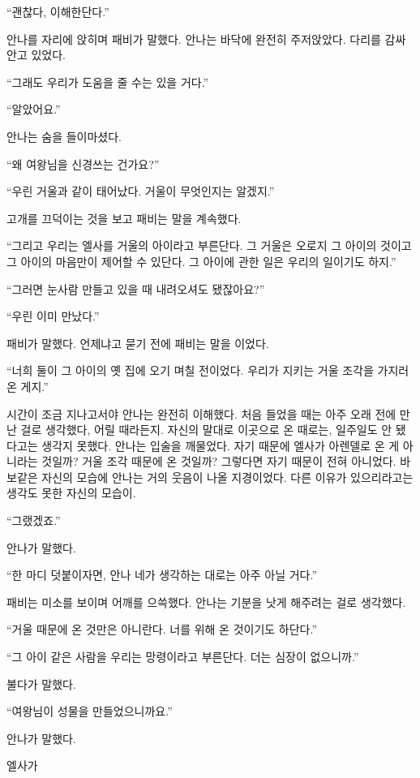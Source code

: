 ``괜찮다, 이해한단다.''

안나를 자리에 앉히며 패비가 말했다. 안나는 바닥에 완전히 주저앉았다. 다리를 감싸 안고 있었다.

``그래도 우리가 도움을 줄 수는 있을 거다.''

``알았어요.''

안나는 숨을 들이마셨다.

``왜 여왕님을 신경쓰는 건가요?''

``우린 거울과 같이 태어났다. 거울이 무엇인지는 알겠지.''

고개를 끄덕이는 것을 보고 패비는 말을 계속했다.

``그리고 우리는 엘사를 거울의 아이라고 부른단다. 그 거울은 오로지 그 아이의 것이고 그 아이의 마음만이 제어할 수 있단다. 그 아이에 관한 일은 우리의 일이기도 하지.''

``그러면 눈사람 만들고 있을 때 내려오셔도 됐잖아요?''

``우린 이미 만났다.''

패비가 말했다. 언제냐고 묻기 전에 패비는 말을 이었다.

``너희 둘이 그 아이의 옛 집에 오기 며칠 전이었다. 우리가 지키는 거울 조각을 가지러 온 게지.''

시간이 조금 지나고서야 안나는 완전히 이해했다. 처음 들었을 때는 아주 오래 전에 만난 걸로 생각했다, 어릴 때라든지. 자신의 말대로 이곳으로 온 때로는, 일주일도 안 됐다고는 생각지 못했다. 안나는 입술을 깨물었다. 자기 때문에 엘사가 아렌델로 온 게 아니라는 것일까? 거울 조각 때문에 온 것일까? 그렇다면 자기 때문이 전혀 아니었다. 바보같은 자신의 모습에 안나는 거의 웃음이 나올 지경이었다. 다른 이유가 있으리라고는 생각도 못한 자신의 모습이.

``그랬겠죠.''

안나가 말했다.

``한 마디 덧붙이자면, 안나 네가 생각하는 대로는 아주 아닐 거다.''

패비는 미소를 보이며 어깨를 으쓱했다. 안나는 기분을 낫게 해주려는 걸로 생각했다.

``거울 때문에 온 것만은 아니란다. 너를 위해 온 것이기도 하단다.''

``그 아이 같은 사람을 우리는 망령이라고 부른단다. 더는 심장이 없으니까.''

불다가 말했다.

``여왕님이 성물을 만들었으니까요.''

안나가 말했다.

엘사가 